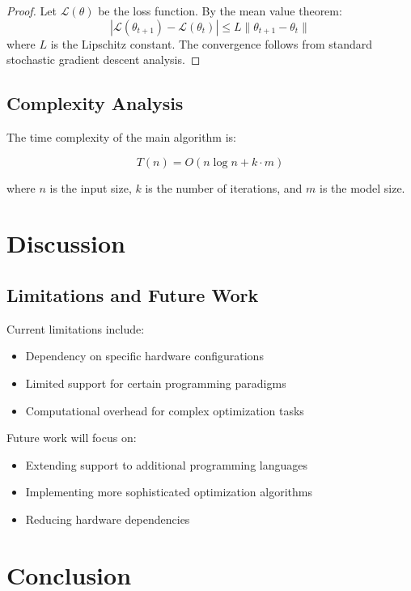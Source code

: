 \documentclass[11pt,a4paper]{article}
\begin{document}
\begin{proof}
Let $\mathcal{L}(\theta)$ be the loss function. By the mean value theorem:
\begin{equation}
|\mathcal{L}(\theta_{t+1}) - \mathcal{L}(\theta_t)| \leq L \|\theta_{t+1} - \theta_t\|
\end{equation}
where $L$ is the Lipschitz constant. The convergence follows from standard stochastic gradient descent analysis.
\end{proof}

\subsection{Complexity Analysis}

The time complexity of the main algorithm is:

\begin{equation}
T(n) = O(n \log n + k \cdot m)
\end{equation}

where $n$ is the input size, $k$ is the number of iterations, and $m$ is the model size.

\section{Discussion}

\subsection{Limitations and Future Work}

Current limitations include:
\begin{itemize}
    \item Dependency on specific hardware configurations
    \item Limited support for certain programming paradigms
    \item Computational overhead for complex optimization tasks
\end{itemize}

Future work will focus on:
\begin{itemize}
    \item Extending support to additional programming languages
    \item Implementing more sophisticated optimization algorithms
    \item Reducing hardware dependencies
\end{itemize}

\section{Conclusion}
\end{document}
